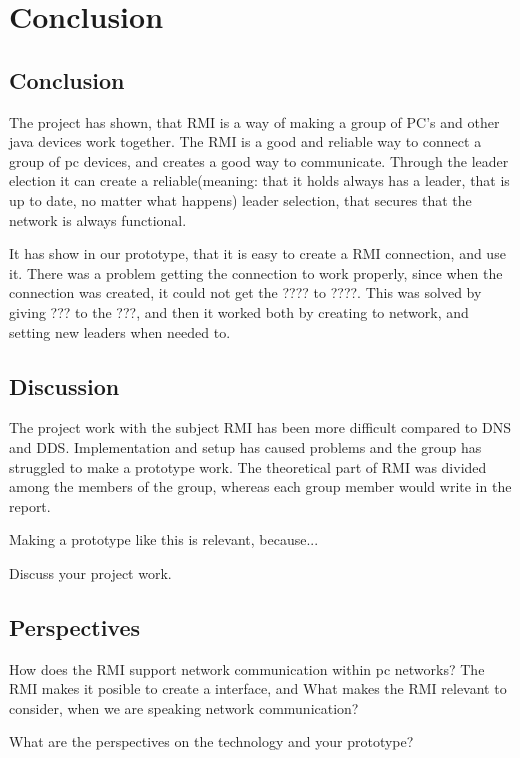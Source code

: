 \chapter{Conclusion}
\section{Conclusion}

The project has shown, that RMI is a way of making a group of PC's and other java devices work together. 
The RMI is a good and reliable way to connect a group of pc devices, and creates a good way to communicate. Through the leader election it can create a reliable(meaning: that it holds always has a leader, that is up to date, no matter what happens) leader selection, that secures that the network is always functional.

It has show in our prototype, that it is easy to create a RMI connection, and use it. There was a problem getting the connection to work properly, since when the connection was created, it could not get the ???? to ????. This was solved by giving ??? to the ???, and then it worked both by creating to network, and setting new leaders when needed to.

\section{Discussion}
The project work with the subject RMI has been more difficult compared to DNS and DDS.
Implementation and setup has caused problems and the group has struggled to make a prototype work.
The theoretical part of RMI was divided among the members of the group, whereas each group member would write in the report.

Making a prototype like this is relevant, because...

Discuss your project work.

\section{Perspectives}
How does the RMI support network communication within pc networks?
The RMI makes it posible to create a interface, and 
What makes the RMI relevant to consider, when we are speaking network communication?

What are the perspectives on the technology and your prototype? 